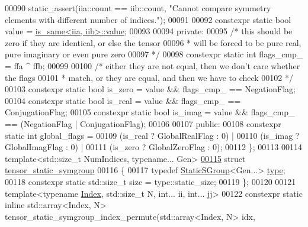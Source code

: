 \begin{DoxyCode}
00090     static\_assert(iia::count == iib::count, \textcolor{stringliteral}{"Cannot compare symmetry elements with different number of
       indices."});
00091 
00092     constexpr \textcolor{keyword}{static} \textcolor{keywordtype}{bool} value = \hyperlink{struct_eigen_1_1internal_1_1is__same}{is\_same<iia, iib>::value};
00093 
00094   \textcolor{keyword}{private}:
00095     \textcolor{comment}{/* this should be zero if they are identical, or else the tensor}
00096 \textcolor{comment}{     * will be forced to be pure real, pure imaginary or even pure zero}
00097 \textcolor{comment}{     */}
00098     constexpr \textcolor{keyword}{static} \textcolor{keywordtype}{int} flags\_cmp\_ = ffa ^ ffb;
00099 
00100     \textcolor{comment}{/* either they are not equal, then we don't care whether the flags}
00101 \textcolor{comment}{     * match, or they are equal, and then we have to check}
00102 \textcolor{comment}{     */}
00103     constexpr \textcolor{keyword}{static} \textcolor{keywordtype}{bool} is\_zero      = value && flags\_cmp\_ == NegationFlag;
00104     constexpr \textcolor{keyword}{static} \textcolor{keywordtype}{bool} is\_real      = value && flags\_cmp\_ == ConjugationFlag;
00105     constexpr \textcolor{keyword}{static} \textcolor{keywordtype}{bool} is\_imag      = value && flags\_cmp\_ == (NegationFlag | ConjugationFlag);
00106 
00107   \textcolor{keyword}{public}:
00108     constexpr \textcolor{keyword}{static} \textcolor{keywordtype}{int} global\_flags = 
00109       (is\_real ? GlobalRealFlag : 0) |
00110       (is\_imag ? GlobalImagFlag : 0) |
00111       (is\_zero ? GlobalZeroFlag : 0);
00112 \};
00113 
00114 \textcolor{keyword}{template}<std::size\_t NumIndices, \textcolor{keyword}{typename}... Gen>
\hyperlink{struct_eigen_1_1internal_1_1tensor__static__symgroup}{00115} \textcolor{keyword}{struct }\hyperlink{struct_eigen_1_1internal_1_1tensor__static__symgroup}{tensor\_static\_symgroup}
00116 \{
00117   \textcolor{keyword}{typedef} \hyperlink{class_eigen_1_1_static_s_group}{StaticSGroup}<Gen...> \hyperlink{class_eigen_1_1_static_s_group}{type};
00118   constexpr \textcolor{keyword}{static} std::size\_t size = type::static\_size;
00119 \};
00120 
00121 \textcolor{keyword}{template}<\textcolor{keyword}{typename} \hyperlink{namespace_eigen_a62e77e0933482dafde8fe197d9a2cfde}{Index}, std::size\_t N, \textcolor{keywordtype}{int}... ii, \textcolor{keywordtype}{int}... jj>
00122 constexpr \textcolor{keyword}{static} \textcolor{keyword}{inline} std::array<Index, N> tensor\_static\_symgroup\_index\_permute(std::array<Index, N> idx,

\end{DoxyCode}

